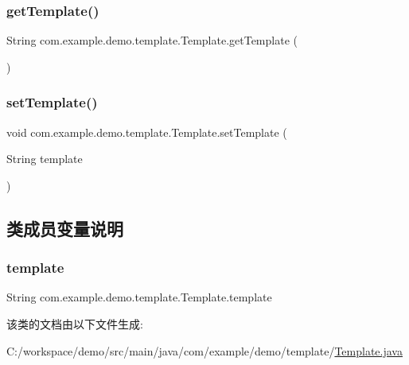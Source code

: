 \subsubsection{\texorpdfstring{get\+Template()}{getTemplate()}}
{\footnotesize\ttfamily String com.\+example.\+demo.\+template.\+Template.\+get\+Template (\begin{DoxyParamCaption}{ }\end{DoxyParamCaption})}

\mbox{\label{classcom_1_1example_1_1demo_1_1template_1_1_template_acea505981f00d7ae593d906700dd46a4}} 
\subsubsection{\texorpdfstring{set\+Template()}{setTemplate()}}
{\footnotesize\ttfamily void com.\+example.\+demo.\+template.\+Template.\+set\+Template (\begin{DoxyParamCaption}\item[{String}]{template }\end{DoxyParamCaption})}



\subsection{类成员变量说明}
\mbox{\label{classcom_1_1example_1_1demo_1_1template_1_1_template_a22c7f4d5717eba277703922ae4fba06c}} 
\subsubsection{\texorpdfstring{template}{template}}
{\footnotesize\ttfamily String com.\+example.\+demo.\+template.\+Template.\+template\hspace{0.3cm}{\ttfamily [private]}}



该类的文档由以下文件生成\+:\begin{DoxyCompactItemize}
\item 
C\+:/workspace/demo/src/main/java/com/example/demo/template/\mbox{\hyperlink{_template_8java}{Template.\+java}}\end{DoxyCompactItemize}
